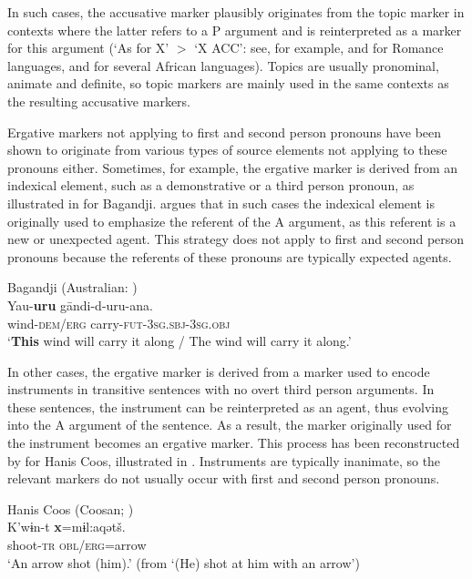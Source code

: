 \documentclass[output=paper]{langsci/langscibook}
\begin{document}
\z
\z

In such cases, the accusative marker
plausibly originates from the topic
marker in contexts where the latter refers to a P argument and  is
reinterpreted as a marker for this argument (`As for X' $>$ `X ACC': see, for example, \citealt{Rohlfs1984} and \citealt{Pensado1995} for Romance
languages, and \citealt{Konig2008} for several African languages). 
Topics are usually pronominal, animate and
definite, so topic markers
are mainly used in the same contexts as the resulting accusative
markers. 

 Ergative markers not applying to first and second person
  pronouns have been shown to originate
from various types of source elements not applying to these pronouns
  either. Sometimes, for example,  the ergative marker is derived from an indexical
element, such as a demonstrative or a third person pronoun, as
illustrated in  for Bagandji.
\citet{McGregor2006,McGregor2008} argues that in such cases the indexical
element is
originally used to emphasize the referent of the A argument, as this
referent is a new or unexpected agent. This strategy does not
    apply to  first and second person pronouns because the referents
    of these pronouns are typically expected agents.

\ea\label{bagandji}
Bagandji (Australian: )\\
\gll Ya{}u-\textbf{{}uru} gāndi-d-uru-ana.\\
wind-\textsc{dem/erg} carry-\textsc{fut-3sg.sbj-3sg.obj}\\
\glt `{\bf This} wind will carry it along / The wind will carry it along.' 
 
\z



In other cases, the ergative marker is derived from a marker used to encode instruments
 in  transitive sentences with no overt third person arguments. In these sentences, the
  instrument can be reinterpreted as an agent, thus evolving into the A
  argument of the sentence. As a result,  the
 marker originally used for the instrument becomes an ergative marker. This process has
  been reconstructed by \citet{Mithun2005} for Hanis Coos, illustrated in
  .  Instruments are typically inanimate, so the relevant markers 
do not usually occur with first and second person pronouns.

\ea 
\label{hanis}
Hanis Coos (Coosan; )\\
\gll K'w​ɨn-t {\textbf{ {\textsubdot x}}}=m​ɨl:aqətš.\\
shoot-\textsc{tr} \textsc{obl/erg}=arrow\\
\glt `An arrow shot (him).' (from `(He) shot at him with an arrow')
\end{document}
